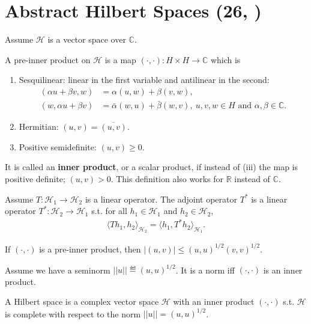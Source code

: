 \section{Abstract Hilbert Spaces \tiny{(26, \cite{schilling2017measures})}}
Assume \(\mathcal{H}\) is a vector space over \(\mathbb{C}\).
\begin{definition}
    A pre-inner product on \(\mathcal{H}\) is a map \((\cdot,\cdot):H\times H\rightarrow\mathbb{C}\) which is
    \begin{enumerate}[label=(\roman*)]
        \item Sesquilinear: linear in the first variable and antilinear in the second:
        \begin{align*}
            (\alpha u + \beta v, w) &= \alpha(u,w) + \beta(v,w), \\
            (w, \alpha u + \beta v) &= \bar{\alpha}(w,u) + \bar{\beta}(w,v), \ u,v,w\in H \text{ and } \alpha,\beta\in\mathbb{C}.
        \end{align*}
        \item Hermitian: \((u,v)=\overline{(u,v)}\).
        \item Positive semidefinite: \((u,v)\geq 0\).
    \end{enumerate}
    It is called an \textbf{inner product}, or a scalar product, if instead of (iii) the map is positive definite; \((u,v)>0\). This definition
    also works for \(\mathbb{R}\) instead of \(\mathbb{C}\).
\end{definition}
\begin{definition}
    Assume \(T:\mathcal{H}_1\rightarrow \mathcal{H}_2\) is a linear operator. The adjoint operator \(T^*\) is a linear operator \(T^*:\mathcal{H}_2\rightarrow \mathcal{H}_1\) s.t. for all \(h_1 \in\mathcal{H}_1\) and \(h_2\in\mathcal{H}_2\),
    \begin{align*}
        \langle Th_1,h_2\rangle_{\mathcal{H}_2} = \langle h_1, T^* h_2\rangle_{\mathcal{H}_1}.
    \end{align*}
\end{definition}
\begin{lemma} If \((\cdot, \cdot)\) is a pre-inner product, then \(\vert (u,v)\vert \leq (u,u)^{1/2}(v,v)^{1/2}\).
\end{lemma}
\begin{corollary}
    Assume we have a seminorm \(||u||\eqdef (u,u)^{1/2}\). It is a norm iff \((\cdot,\cdot)\) is an inner product.
\end{corollary}
\begin{definition}
    A Hilbert space is a complex vector space \(\mathcal{H}\) with an inner product \((\cdot,\cdot)\) s.t. \(\mathcal{H}\) is complete with respect to the norm
    \(||u|| = (u,u)^{1/2}\).
\end{definition}

